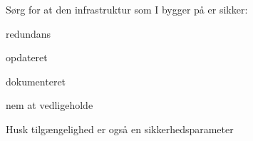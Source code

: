 \documentclass[Screen16to9,17pt]{foils}
\begin{document}

\begin{list1}
\item Sørg for at den infrastruktur som I bygger på er sikker:
\begin{list2}
 \item redundans
       \item opdateret
        \item dokumenteret
        \item nem at vedligeholde
\end{list2}

\item  Husk tilgængelighed er også en sikkerhedsparameter
\end{list1}
\end{document}
